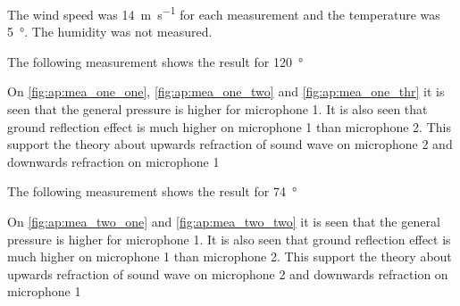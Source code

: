 The wind speed was \SI{14}{\meter\per\second} for each measurement and the temperature was \SI{5}{\degree}. The humidity was not measured. 

The following measurement shows the result for \SI{120}{\degree}


On \autoref{fig:ap:mea_one_one}, \autoref{fig:ap:mea_one_two} and \autoref{fig:ap:mea_one_thr} it is seen that the general pressure is higher for microphone 1. It is also seen that ground reflection effect is much higher on microphone 1 than microphone 2. This support the theory about upwards refraction of sound wave on microphone 2 and downwards refraction on microphone 1 

The following measurement shows the result for \SI{74}{\degree}


On \autoref{fig:ap:mea_two_one} and \autoref{fig:ap:mea_two_two} it is seen that the general pressure is higher for microphone 1. It is also seen that ground reflection effect is much higher on microphone 1 than microphone 2. This support the theory about upwards refraction of sound wave on microphone 2 and downwards refraction on microphone 1 


